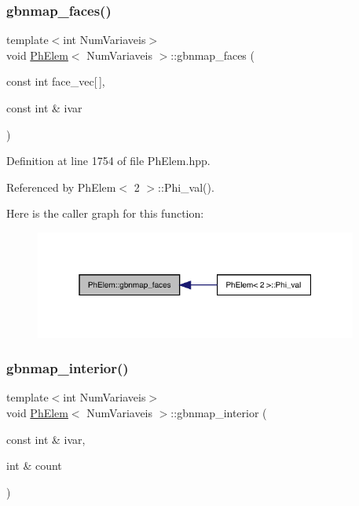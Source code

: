 \subsubsection{\texorpdfstring{gbnmap\+\_\+faces()}{gbnmap\_faces()}}
{\footnotesize\ttfamily template$<$int Num\+Variaveis$>$ \\
void \hyperlink{classPhElem}{Ph\+Elem}$<$ Num\+Variaveis $>$\+::gbnmap\+\_\+faces (\begin{DoxyParamCaption}\item[{const int}]{face\+\_\+vec\mbox{[}$\,$\mbox{]},  }\item[{const int \&}]{ivar }\end{DoxyParamCaption})}



Definition at line 1754 of file Ph\+Elem.\+hpp.



Referenced by Ph\+Elem$<$ 2 $>$\+::\+Phi\+\_\+val().

Here is the caller graph for this function\+:
\nopagebreak
\begin{figure}[H]
\begin{center}
\leavevmode
\includegraphics[width=301pt]{classPhElem_ad355231f4e2807541c62212647c44b3e_icgraph}
\end{center}
\end{figure}
\mbox{\label{classPhElem_ae6f35113c182e2678646552e6c4a752c}} 
\subsubsection{\texorpdfstring{gbnmap\+\_\+interior()}{gbnmap\_interior()}}
{\footnotesize\ttfamily template$<$int Num\+Variaveis$>$ \\
void \hyperlink{classPhElem}{Ph\+Elem}$<$ Num\+Variaveis $>$\+::gbnmap\+\_\+interior (\begin{DoxyParamCaption}\item[{const int \&}]{ivar,  }\item[{int \&}]{count }\end{DoxyParamCaption})}




